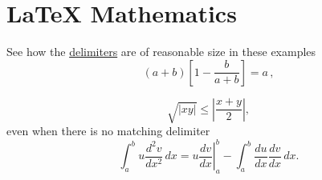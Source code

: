 \section{LaTeX Mathematics}
\label{sec:latexmath}
See how the \href{http://del.com}{delimiters} are of reasonable size in these examples
\begin{equation}
\label{eq:del1}
	\left(a+b\right)\left[1-\frac{b}{a+b}\right]=a\,,
\end{equation}

\[
	\sqrt{|xy|}\leq\left|\frac{x+y}{2}\right|,
\]
even when there is no matching delimiter
\[
	\int_a^bu\frac{d^2v}{dx^2}\,dx
	=\left.u\frac{dv}{dx}\right|_a^b
	-\int_a^b\frac{du}{dx}\frac{dv}{dx}\,dx.
\]
